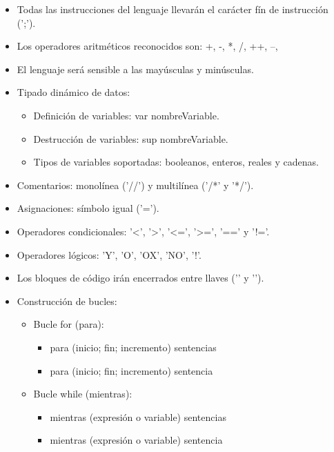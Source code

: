    \begin{itemize}
      \item Todas las instrucciones del lenguaje llevarán el carácter fín de instrucción (’;’). 
      \item Los operadores aritméticos reconocidos son: +, -, *, /, ++, –, %
      \item El lenguaje será sensible a las mayúsculas y minúsculas.
      \item Tipado dinámico de datos: 
            \begin{itemize}
               \item Definición de variables: var nombreVariable. 
               \item Destrucción de variables: sup nombreVariable. 
               \item Tipos de variables soportadas: booleanos, enteros, reales y cadenas. 
            \end{itemize}
      \item Comentarios: monolínea (’//’) y multilínea (’/*’ y ’*/’). 
      \item Asignaciones: símbolo igual (’=’). 
      \item Operadores condicionales: ’<’, ’>’, ’<=’, ’>=’, ’==’ y ’!=’. 
      \item Operadores lógicos: ’Y’, ’O’, ’OX’, ’NO’, ’!’. 
      \item Los bloques de código irán encerrados entre llaves (’{’ y ’}’).
      \item Construcción de bucles: 
            \begin{itemize}
               \item Bucle for (para):
                     \begin{itemize}
                        \item para (inicio; fin; incremento) { sentencias } 
                        \item para (inicio; fin; incremento) sentencia 
                     \end{itemize}
               \item Bucle while (mientras):
                     \begin{itemize}
                        \item mientras (expresión o variable) { sentencias } 
                        \item mientras (expresión o variable) sentencia 
                     \end{itemize}
            \end{itemize}

\end{itemize}
